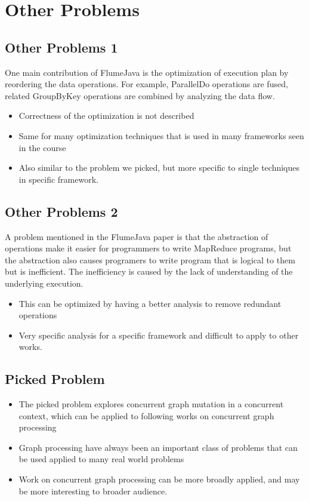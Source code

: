 \section{Other Problems}
\subsection{Other Problems 1}
\begin{frame}
One main contribution of FlumeJava is the optimization of execution plan by
reordering the data operations. For example, ParallelDo operations are fused,
related GroupByKey operations are combined by analyzing the data flow.
\begin{itemize}
  \item Correctness of the optimization is not described
  \item Same for many optimization techniques that is used in many frameworks
  seen in the course
  \item Also similar to the problem we picked, but more specific to single
  techniques in specific framework.
\end{itemize}
\end{frame}

\subsection{Other Problems 2}
\begin{frame}
A problem mentioned in the FlumeJava paper is that the abstraction of
operations make it easier for programmers to write MapReduce programs, but the
abstraction also causes programers to write program that is logical to them but
is inefficient. The inefficiency is caused by the lack of understanding of the
underlying execution.
\begin{itemize}
  \item This can be optimized by having a better analysis to remove redundant
  operations
  \item Very specific analysis for a specific framework and difficult to apply
  to other works.
\end{itemize}
\end{frame}

\subsection{Picked Problem}
\begin{frame}
\begin{itemize}
  \item The picked problem explores concurrent graph mutation in a concurrent context,
which can be applied to following works on concurrent graph processing
  \item Graph processing have always been an important class of problems that
  can be used applied to many real world problems
  \item Work on concurrent graph processing can be more broadly applied, and may
  be more interesting to broader audience.
\end{itemize}
\end{frame}